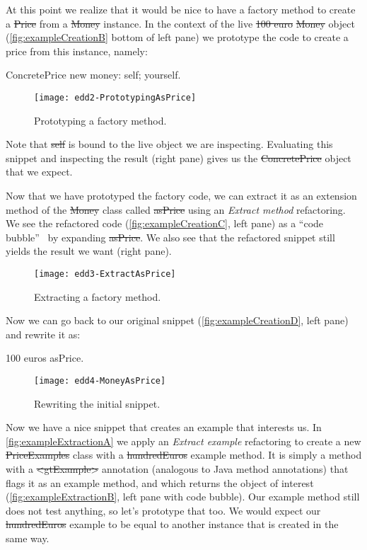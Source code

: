 \documentclass[sigplan,anonymous,review,10pt]{acmart}
\begin{document}
At this point we realize that it would be nice to have a factory method to create a \st{Price} from a \st{Money} instance.
In the context of the live \st{100 euro} \st{Money} object (\autoref{fig:exampleCreationB} bottom of left pane) we prototype the code to create a price from this instance, namely:
\begin{code}
ConcretePrice new money: self; yourself.
\end{code}

\begin{figure}[h]
  \texttt{[image: edd2-PrototypingAsPrice]}
	\caption{Prototyping a factory method.}
  \label{fig:exampleCreationB}
\end{figure}

Note that \st{self} is bound to the live object we are inspecting.
Evaluating this snippet and inspecting the result (right pane) gives us the \st{ConcretePrice} object that we expect.



Now that we have prototyped the factory code, we can extract it as an extension method of the \st{Money} class called \st{asPrice} using an \emph{Extract method} refactoring.
We see the refactored code (\autoref{fig:exampleCreationC}, left pane) as a ``code bubble''~\cite{Brag10a} by expanding \st{asPrice}.
We also see that the refactored snippet still yields the result we want (right pane).

\begin{figure}[h]
  \texttt{[image: edd3-ExtractAsPrice]}
	\caption{Extracting a factory method.}
  \label{fig:exampleCreationC}
\end{figure}


Now we can go back to our original snippet (\autoref{fig:exampleCreationD}, left pane) and rewrite it as:
\begin{code}
100 euros asPrice.
\end{code}

\begin{figure}[h]
  \texttt{[image: edd4-MoneyAsPrice]}
	\caption{Rewriting the initial snippet.}
  \label{fig:exampleCreationD}
\end{figure}


Now we have a nice snippet that creates an example that interests us.
In \autoref{fig:exampleExtractionA} we apply an \emph{Extract example} refactoring to create a new \st{PriceExamples} class with a \st{hundredEuros} example  method.
It is simply a method with a \st{<gtExample>} annotation (analogous to Java method annotations) that flags it as an example method, and which returns the object of interest (\autoref{fig:exampleExtractionB}, left pane with code bubble).
Our example method still does not test anything, so let's prototype that too.
We would expect our \st{hundredEuros} example to be equal to another instance that is created in the same way.
\end{document}

